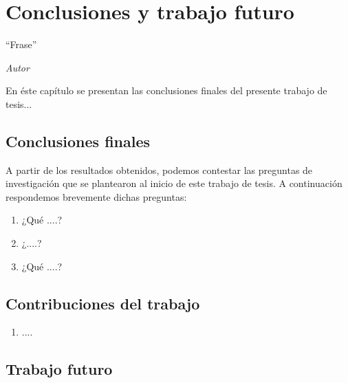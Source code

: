 \chapter{Conclusiones y trabajo futuro}\label{cap:conclusiones}
\epigraph{``Frase''
}{\textit{ Autor }}

En éste capítulo se presentan las conclusiones finales del presente trabajo de tesis...
\section{Conclusiones finales}

A partir de los resultados obtenidos, podemos contestar las preguntas de investigación que se plantearon al inicio de este trabajo de tesis. A continuación respondemos brevemente dichas preguntas:
\begin{enumerate}
  \item ¿Qué ....?
  

\item ¿....?

\item ¿Qué ....?
  

\end{enumerate}


\section{Contribuciones del trabajo}

\begin{enumerate}
    \item {....}
    
\end{enumerate}

\section{Trabajo futuro}


